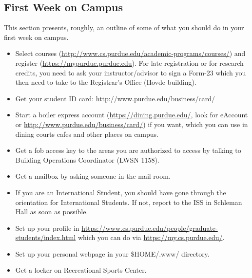 \subsection{First Week on Campus}

This section presents, roughly, an outline of some of what you should do in your first week on campus.

\begin{itemize}
	\item Select courses (\url{http://www.cs.purdue.edu/academic-programs/courses/}) and register (\url{https://mypurdue.purdue.edu}). For late registration or for research credits, you need to ask your instructor/advisor to sign a Form-23 which you then need to take to the Registrar's Office (Hovde building).

	\item Get your student ID card: \url{http://www.purdue.edu/business/card/}

	\item Start a boiler express account (\url{https://dining.purdue.edu/}, look for eAccount or \url{http://www.purdue.edu/business/card/}) if you want, which you can use in dining courts cafes and other places on campus.

	\item Get a fob access key to the areas you are authorized to access by talking to Building Operations Coordinator (LWSN 1158).

	\item Get a mailbox by asking someone in the mail room.

	\item If you are an International Student, you should have gone through the orientation for International Students. If not, report to the ISS in Schleman Hall as soon as possible.

	\item Set up your profile in \url{https://www.cs.purdue.edu/people/graduate-students/index.html} which you can do via \url{https://my.cs.purdue.edu/}.

	\item Set up your personal webpage in your \$HOME/.www/ directory.

	\item Get a locker on Recreational Sports Center.

\end{itemize}

